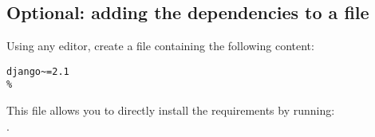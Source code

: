     \subsection{Optional: adding the dependencies to a file}
        \noindent Using any editor, create a  file 
        containing the following content:

        \begin{lstlisting}[title=\texttt{requirements.txt}]
django~=2.1
%
        \end{lstlisting}
        
        This file allows you to directly install the requirements by running: \\
        .
 